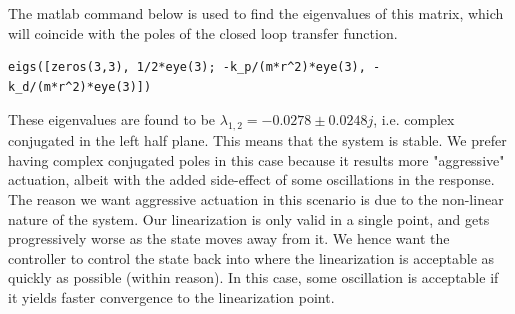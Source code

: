 The matlab command below is used to find the eigenvalues of this matrix, which will coincide with the poles of the closed loop transfer function.
\lstset{language=Matlab, basicstyle=\small}
\begin{lstlisting}[frame=single]
eigs([zeros(3,3), 1/2*eye(3); -k_p/(m*r^2)*eye(3), -k_d/(m*r^2)*eye(3)])
\end{lstlisting}
These eigenvalues are found to be $\lambda_{1,2} = -0.0278 \pm 0.0248j$, i.e. complex conjugated in the left half plane. This means that the system is stable. We prefer having complex conjugated poles in this case because it results more "aggressive" actuation, albeit with the added side-effect of some oscillations in the response. The reason we want aggressive actuation in this scenario is due to the non-linear nature of the system. Our linearization is only valid in a single point, and gets progressively worse as the state moves away from it. We hence want the controller to control the state back into where the linearization is acceptable as quickly as possible (within reason). In this case, some oscillation is acceptable if it yields faster convergence to the linearization point.

